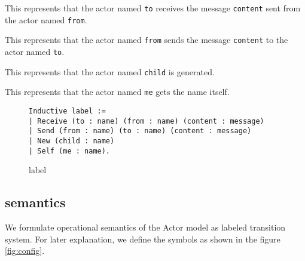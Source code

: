 
\begin{description}[style=nextline,leftmargin=12pt,parsep=0pt]
\item[\texttt{Receive (to : name) (from : name) (content : message)}]
  This represents that the actor named \lstinline|to| receives the message \lstinline|content| sent from the actor named \lstinline|from|.
\item[\texttt{Send (from : name) (to : name) (content : message)}]
  This represents that the actor named \lstinline|from| sends the message \lstinline|content| to the actor named \lstinline|to|.
\item[\texttt{New (child : name)}]
  This represents that the actor named \lstinline|child| is generated.
\item[\texttt{Self (me : name)}]
  This represents that the actor named \lstinline|me| gets the name itself.
\end{description}


\begin{figure}[t]
  \begin{lstlisting}
Inductive label :=
| Receive (to : name) (from : name) (content : message)
| Send (from : name) (to : name) (content : message)
| New (child : name)
| Self (me : name).
  \end{lstlisting}
  \caption{label}\label{coq:label}
\end{figure}


\subsection{semantics}

We formulate operational semantics of the Actor model as labeled transition system.
For later explanation, we define the symbols as shown in the figure \ref{fig:config}.

